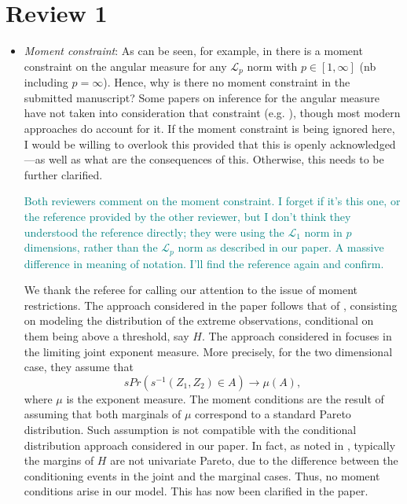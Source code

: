 \documentclass[10pt]{article}
\newcommand{\comment}[1]{\textcolor{teal}{#1}}
\begin{document}
\section*{Review 1}
\begin{itemize}
    \item \emph{Moment constraint}: As can be seen, for example, in \cite[Equation 4.1]{einmahl2009}
    there is a moment constraint on the angular measure for any $\mathcal{L}_p$ norm with 
    $p \in [1, \infty]$ (nb including $p = \infty$).  Hence, why is there no moment constraint in 
    the submitted 
    manuscript? Some papers on inference for the angular measure have not taken into consideration 
    that constraint (e.g. \cite{einmahl2001}), though most modern approaches do account for it. If 
    the moment constraint is being ignored here, I would be willing to overlook this provided that 
    this is openly acknowledged---as well as what are the consequences of this. Otherwise, this needs 
    to be further clarified.

    \comment{Both reviewers comment on the moment constraint.  I forget if it's this one, or
    the reference provided by the other reviewer, but I don't think they understood the reference
    directly; they were using the $\mathcal{L}_1$ norm in $p$ dimensions, rather than the 
    $\mathcal{L}_p$ norm as described in our paper.  A massive difference in meaning of notation.
    I'll find the reference again and confirm.}
    
    We thank the referee for calling our attention to
the issue of moment restrictions. The approach considered in the
paper follows that of \cite{rootzen2018}, consisting on modeling the
distribution of the extreme observations, conditional on them being
above a threshold, say $H$.  The approach considered in
\cite{EiSe2009} focuses in the limiting joint exponent measure. More
precisely, for the two dimensional case, they assume that
\[
	sPr(s^{-1}(Z_1,Z_2) \in A) \rightarrow \mu(A),
\]
where $\mu$ is the exponent measure. The moment conditions are
the result of assuming that both marginals of $\mu$ correspond to a
standard Pareto distribution. Such assumption is not compatible
with the conditional distribution approach considered in our paper.
In fact, as noted in \cite{KiRoSeWa2019}, typically the margins of
$H$ are not univariate Pareto, due to the difference between the 
conditioning events in the joint and the marginal cases. Thus, no
moment conditions arise in our model. This has now been clarified in the paper.


\end{itemize}
\end{document}
